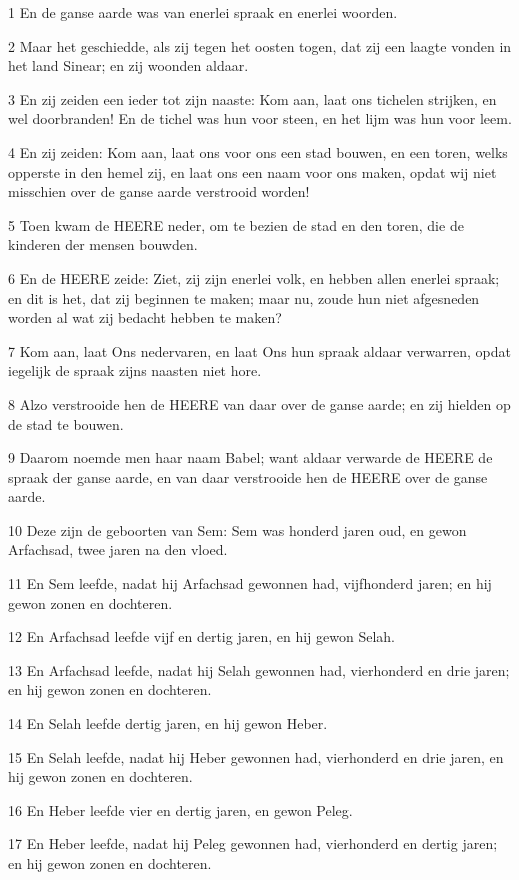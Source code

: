 \par 1 En de ganse aarde was van enerlei spraak en enerlei woorden.
\par 2 Maar het geschiedde, als zij tegen het oosten togen, dat zij een laagte vonden in het land Sinear; en zij woonden aldaar.
\par 3 En zij zeiden een ieder tot zijn naaste: Kom aan, laat ons tichelen strijken, en wel doorbranden! En de tichel was hun voor steen, en het lijm was hun voor leem.
\par 4 En zij zeiden: Kom aan, laat ons voor ons een stad bouwen, en een toren, welks opperste in den hemel zij, en laat ons een naam voor ons maken, opdat wij niet misschien over de ganse aarde verstrooid worden!
\par 5 Toen kwam de HEERE neder, om te bezien de stad en den toren, die de kinderen der mensen bouwden.
\par 6 En de HEERE zeide: Ziet, zij zijn enerlei volk, en hebben allen enerlei spraak; en dit is het, dat zij beginnen te maken; maar nu, zoude hun niet afgesneden worden al wat zij bedacht hebben te maken?
\par 7 Kom aan, laat Ons nedervaren, en laat Ons hun spraak aldaar verwarren, opdat iegelijk de spraak zijns naasten niet hore.
\par 8 Alzo verstrooide hen de HEERE van daar over de ganse aarde; en zij hielden op de stad te bouwen.
\par 9 Daarom noemde men haar naam Babel; want aldaar verwarde de HEERE de spraak der ganse aarde, en van daar verstrooide hen de HEERE over de ganse aarde.
\par 10 Deze zijn de geboorten van Sem: Sem was honderd jaren oud, en gewon Arfachsad, twee jaren na den vloed.
\par 11 En Sem leefde, nadat hij Arfachsad gewonnen had, vijfhonderd jaren; en hij gewon zonen en dochteren.
\par 12 En Arfachsad leefde vijf en dertig jaren, en hij gewon Selah.
\par 13 En Arfachsad leefde, nadat hij Selah gewonnen had, vierhonderd en drie jaren; en hij gewon zonen en dochteren.
\par 14 En Selah leefde dertig jaren, en hij gewon Heber.
\par 15 En Selah leefde, nadat hij Heber gewonnen had, vierhonderd en drie jaren, en hij gewon zonen en dochteren.
\par 16 En Heber leefde vier en dertig jaren, en gewon Peleg.
\par 17 En Heber leefde, nadat hij Peleg gewonnen had, vierhonderd en dertig jaren; en hij gewon zonen en dochteren.
